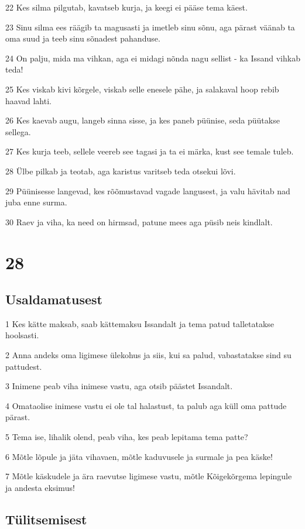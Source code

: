 \par 22 Kes silma pilgutab, kavatseb kurja, ja keegi ei pääse tema käest.
\par 23 Sinu silma ees räägib ta magusasti ja imetleb sinu sõnu, aga pärast väänab ta oma suud ja teeb sinu sõnadest pahanduse.
\par 24 On palju, mida ma vihkan, aga ei midagi nõnda nagu sellist - ka Issand vihkab teda!
\par 25 Kes viskab kivi kõrgele, viskab selle enesele pähe, ja salakaval hoop rebib haavad lahti.
\par 26 Kes kaevab augu, langeb sinna sisse, ja kes paneb püünise, seda püütakse sellega.
\par 27 Kes kurja teeb, sellele veereb see tagasi ja ta ei märka, kust see temale tuleb.
\par 28 Ülbe pilkab ja teotab, aga karistus varitseb teda otsekui lõvi.
\par 29 Püünisesse langevad, kes rõõmustavad vagade langusest, ja valu hävitab nad juba enne surma.
\par 30 Raev ja viha, ka need on hirmsad, patune mees aga püsib neis kindlalt.

\chapter{28}

\section*{Usaldamatusest}

\par 1 Kes kätte maksab, saab kättemaksu Issandalt ja tema patud talletatakse hoolsasti.
\par 2 Anna andeks oma ligimese ülekohus ja siis, kui sa palud, vabastatakse sind su pattudest.
\par 3 Inimene peab viha inimese vastu, aga otsib päästet Issandalt.
\par 4 Omataolise inimese vastu ei ole tal halastust, ta palub aga küll oma pattude pärast.
\par 5 Tema ise, lihalik olend, peab viha, kes peab lepitama tema patte?
\par 6 Mõtle lõpule ja jäta vihavaen, mõtle kaduvusele ja surmale ja pea käske!
\par 7 Mõtle käskudele ja ära raevutse ligimese vastu, mõtle Kõigekõrgema lepingule ja andesta eksimus!

\section*{Tülitsemisest}

